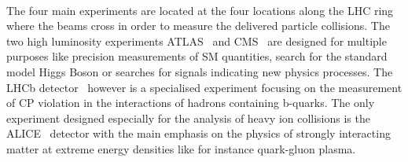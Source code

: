 \\
The four main experiments are located at the four locations along the LHC ring where the beams cross in order to measure the delivered particle collisions. The two high luminosity experiments ATLAS~\cite{det::ATLAS} and CMS~\cite{Chatrchyan:2008zzk, bib:cmsptdr1} are designed for multiple purposes like precision measurements of SM quantities, search for the standard model Higgs Boson or searches for signals indicating new physics processes. The LHCb detector~\cite{det::LHCb} however is a specialised experiment focusing on the measurement of CP violation in the interactions of hadrons containing b-quarks. The only experiment designed especially for the analysis of heavy ion collisions is the ALICE~\cite{det::ALICE} detector with the main emphasis on the physics of strongly interacting matter at extreme energy densities like for instance quark-gluon plasma.

